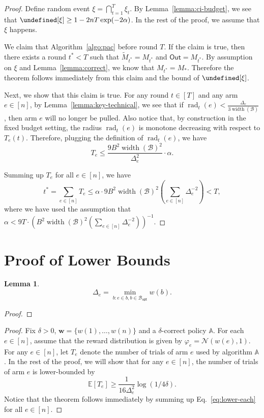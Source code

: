 \documentclass{article}
\newtheorem{lemma}{Lemma}
\newcommand{\Rew}{\varphi}
\newcommand{\E}{\mathbb E}
\newcommand{\B}{\mathcal B}
\newcommand{\Bopt}{\mathcal B_{\mathsf{opt}}}
\DeclareMathOperator{\rank}{width}
\DeclareMathOperator{\rad}{rad}
\newcommand{\out}{\mathsf{Out}}
\let\Pr\undefined
\DeclareMathOperator{\Pr}{Pr}
\renewcommand{\vec}[1]{\boldsymbol{#1}}
\begin{document}
\begin{spacing}{1.1}
\begin{proof}
Define random event $\xi=\bigcap_{t=1}^T \xi_t$. 
By Lemma~\ref{lemma:ci-budget}, we see that $\Pr[\xi] \ge 1-2nT\exp(-2\alpha)$.
In the rest of the proof, we assume that $\xi$ happens.

We claim that Algorithm~\ref{algo:pac} before round $T$.
If the claim is true, then there exists a round $t^* < T$ such that $\tilde M_{t^*} = M_{t^*}$ and $\out = M_{t^*}$.
By assumption on $\xi$ and Lemma~\ref{lemma:correct}, we know that $M_{t^*} = M_*$.
Therefore the theorem follows immediately from this claim and the bound of $\Pr[\xi]$.

Next, we show that this claim is true.
For any round $t \in [T]$ and any arm $e\in[n]$, 
by Lemma~\ref{lemma:key-technical}, 
we see that if $\rad_t(e) < \frac{\Delta_e}{3\rank(\B)}$, then arm $e$ will no longer be pulled.
Also notice that, by construction in the fixed budget setting, the radius $\rad_t(e)$ is monotone decreasing with respect to $T_e(t)$.
Therefore, plugging the definition of $\rad_t(e)$, we have
$$
T_e \le \frac{9B^2\rank(\B)^2}{\Delta_e^2}\cdot\alpha.
$$

Summing up $T_e$ for all $e\in [n]$, we have
$$
t^* = \sum_{e\in [n]} T_e \le \alpha \cdot 9B^2\rank(\B)^2 \left(\sum_{e\in[n]}\Delta_e^{-2}\right) < T,
$$
where we have used the assumption that $\alpha < 9 T \cdot \left(B^2\rank(\B)^2 \left(\sum_{e\in[n]}\Delta_e^{-2}\right)\right)^{-1}.$

\end{proof}



\section{Proof of Lower Bounds}

\begin{lemma}
$$
\Delta_e = \min_{b: e \in b, b \in \Bopt} w(b).
$$
\end{lemma}

\begin{proof}
\end{proof}


\begin{proof}
Fix $\delta >0$, $\vec w =\{w(1),\ldots,w(n)\}$ and a $\delta$-correct policy $\mathbb A$.
For each $e\in [n]$, assume that the reward distribution is given by $\Rew_e=\mathcal N(w(e),1)$.
For any $e\in [n]$, let $T_e$ denote the  number of trials of arm $e$ used by algorithm $\mathbb A$.
In the rest of the proof, we will show that for any $e\in [n]$, the number of trials of arm $e$ is lower-bounded by
\begin{equation}
\E[T_e] \ge \frac{1}{16\Delta_e^2}\log(1/4\delta).
\label{eq:lower-each}
\end{equation}
Notice that the theorem follows immediately by summing up Eq.~\eqref{eq:lower-each} for all $e\in[n]$.



\end{proof}
\end{spacing}
\end{document}
